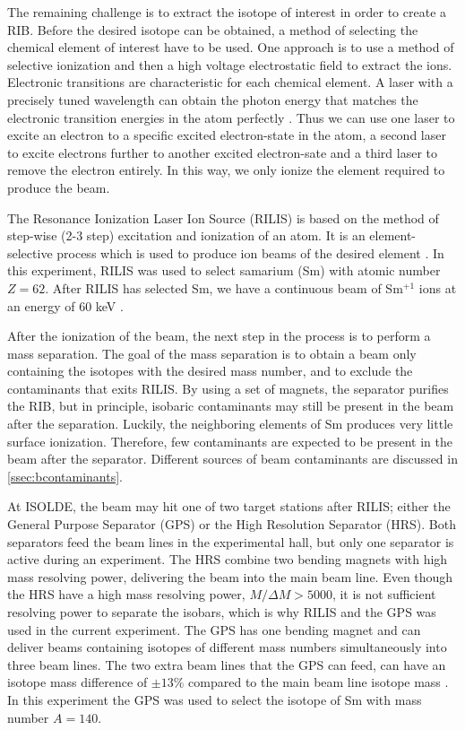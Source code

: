 \documentclass[twoside,english]{uiofysmaster/uiofysmaster}
\let\orgautoref\autoref
\renewcommand{\autoref}
        {%
		 \def\sectionautorefname{Section}%
		 \def\subsectionautorefname{Section}%
		 \def\subsubsectionautorefname{Section}%
		 \def\chapterautorefname{Chapter}%
          \orgautoref}
\begin{document}
The remaining challenge is to extract the isotope of interest in order to create a RIB. 
Before the desired isotope can be obtained, a method of selecting the chemical element of interest have to be used.
One approach is to use a method of selective ionization and then a high voltage electrostatic field to extract the ions. 
Electronic transitions are characteristic for each chemical element. 
A laser with a precisely tuned wavelength can obtain the photon energy that matches the electronic transition energies in the atom perfectly \cite{RILIS-web, RILIS2013}. 
Thus we can use one laser to excite an electron to a specific excited electron-state in the atom, a second laser to excite electrons further to another excited electron-sate and a third laser to remove the electron entirely. 
In this way, we only ionize the element required to produce the beam. 

The Resonance Ionization Laser Ion Source (RILIS) is based on the method of step-wise (2-3 step) excitation and ionization of an atom. 
It is an element-selective process which is used to produce ion beams of the desired element \cite{RILIS}. 
In this experiment, RILIS was used to select samarium (Sm) with atomic number $Z = 62$. 
After RILIS has selected Sm, we have a continuous beam of Sm$^{+1}$ ions at an energy of 60 keV  \cite{ISOLDE-web, TIF}. 

After the ionization of the beam, the next step in the process is to perform a mass separation.
The goal of the mass separation is to obtain a beam only containing the isotopes with the desired mass number, and to exclude the contaminants that exits RILIS. 
By using a set of magnets, the separator purifies the RIB, but in principle, isobaric contaminants may still be present in the beam after the separation. 
Luckily, the neighboring elements of Sm produces very little surface ionization. 
Therefore, few contaminants are expected to be present in the beam after the separator. 
Different sources of beam contaminants are discussed in \autoref{ssec:bcontaminants}.

At ISOLDE, the beam may hit one of two target stations after RILIS; either the General Purpose Separator (GPS) or the High Resolution Separator (HRS). 
Both separators feed the beam lines in the experimental hall, but only one separator is active during an experiment. 
The HRS combine two bending magnets with high mass resolving power, delivering the beam into the main beam line. 
Even though the HRS have a high mass resolving power, $M/\Delta M > 5000$, it is not sufficient resolving power to separate the isobars, which is why RILIS and the GPS was used in the current experiment.
The GPS has one bending magnet and can deliver beams containing isotopes of different mass numbers simultaneously into three beam lines. 
The two extra beam lines that the GPS can feed, can have an isotope mass difference of $\pm 13 \%$ compared to the main beam line isotope mass \cite{GPS, TIF}.
In this experiment the GPS was used to select the isotope of Sm with mass number $A = 140$. 
\end{document}

